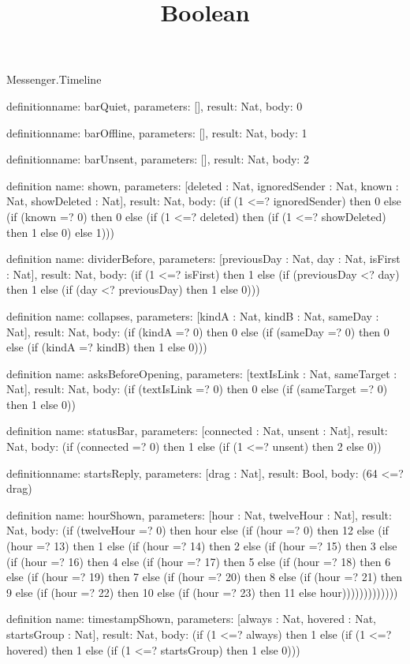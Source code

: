 \begin{lexlean}{Messenger.Timeline}
\title{Boolean}
\begin{semanticmodule}
definition{name: barQuiet, parameters: [], result: Nat, body: 0}

definition{name: barOffline, parameters: [], result: Nat, body: 1}

definition{name: barUnsent, parameters: [], result: Nat, body: 2}

definition{
  name: shown,
  parameters: [deleted : Nat, ignoredSender : Nat, known : Nat, showDeleted : Nat],
  result: Nat,
  body: (if (1 <=? ignoredSender) then 0 else (if (known =? 0) then 0 else (if (1 <=? deleted) then (if (1 <=? showDeleted) then 1 else 0) else 1)))
}

definition{
  name: dividerBefore,
  parameters: [previousDay : Nat, day : Nat, isFirst : Nat],
  result: Nat,
  body: (if (1 <=? isFirst) then 1 else (if (previousDay <? day) then 1 else (if (day <? previousDay) then 1 else 0)))
}

definition{
  name: collapses,
  parameters: [kindA : Nat, kindB : Nat, sameDay : Nat],
  result: Nat,
  body: (if (kindA =? 0) then 0 else (if (sameDay =? 0) then 0 else (if (kindA =? kindB) then 1 else 0)))
}

definition{
  name: asksBeforeOpening,
  parameters: [textIsLink : Nat, sameTarget : Nat],
  result: Nat,
  body: (if (textIsLink =? 0) then 0 else (if (sameTarget =? 0) then 1 else 0))
}

definition{
  name: statusBar,
  parameters: [connected : Nat, unsent : Nat],
  result: Nat,
  body: (if (connected =? 0) then 1 else (if (1 <=? unsent) then 2 else 0))
}

definition{name: startsReply, parameters: [drag : Nat], result: Bool, body: (64 <=? drag)}

definition{
  name: hourShown,
  parameters: [hour : Nat, twelveHour : Nat],
  result: Nat,
  body: (if (twelveHour =? 0) then hour else (if (hour =? 0) then 12 else (if (hour =? 13) then 1 else (if (hour =? 14) then 2 else (if (hour =? 15) then 3 else (if (hour =? 16) then 4 else (if (hour =? 17) then 5 else (if (hour =? 18) then 6 else (if (hour =? 19) then 7 else (if (hour =? 20) then 8 else (if (hour =? 21) then 9 else (if (hour =? 22) then 10 else (if (hour =? 23) then 11 else hour)))))))))))))
}

definition{
  name: timestampShown,
  parameters: [always : Nat, hovered : Nat, startsGroup : Nat],
  result: Nat,
  body: (if (1 <=? always) then 1 else (if (1 <=? hovered) then 1 else (if (1 <=? startsGroup) then 1 else 0)))
}


\end{semanticmodule}
\end{lexlean}
